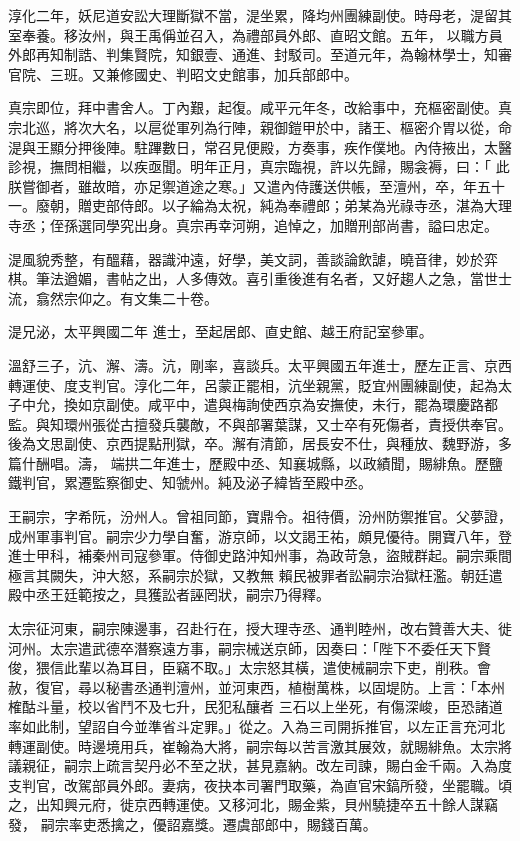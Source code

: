 \begin{pinyinscope}
 淳化二年，妖尼道安訟大理斷獄不當，湜坐累，降均州團練副使。時母老，湜留其室奉養。移汝州，與王禹偁並召入，為禮部員外郎、直昭文館。五年，
 以職方員外郎再知制誥、判集賢院，知銀壹、通進、封駁司。至道元年，為翰林學士，知審官院、三班。又兼修國史、判昭文史館事，加兵部郎中。



 真宗即位，拜中書舍人。丁內艱，起復。咸平元年冬，改給事中，充樞密副使。真宗北巡，將次大名，以扈從軍列為行陣，親御鎧甲於中，諸王、樞密介胃以從，命湜與王顯分押後陣。駐蹕數日，常召見便殿，方奏事，疾作僕地。內侍掖出，太醫診視，撫問相繼，以疾亟聞。明年正月，真宗臨視，許以先歸，賜衾褥，曰：「
 此朕嘗御者，雖故暗，亦足禦道途之寒。」又遣內侍護送供帳，至澶州，卒，年五十一。廢朝，贈吏部侍郎。以子綸為太祝，純為奉禮郎；弟某為光祿寺丞，湛為大理寺丞；侄孫選同學究出身。真宗再幸河朔，追悼之，加贈刑部尚書，謚曰忠定。



 湜風貌秀整，有醞藉，器識沖遠，好學，美文詞，善談論飲謔，曉音律，妙於弈棋。筆法遒媚，書帖之出，人多傳效。喜引重後進有名者，又好趨人之急，當世士流，翕然宗仰之。有文集二十卷。



 湜兄泌，太平興國二年
 進士，至起居郎、直史館、越王府記室參軍。



 溫舒三子，沆、澥、濤。沆，剛率，喜談兵。太平興國五年進士，歷左正言、京西轉運使、度支判官。淳化二年，呂蒙正罷相，沆坐親黨，貶宜州團練副使，起為太子中允，換如京副使。咸平中，遣與梅詢使西京為安撫使，未行，罷為環慶路都監。與知環州張從古擅發兵襲敵，不與部署葉謀，又士卒有死傷者，責授供奉官。後為文思副使、京西提點刑獄，卒。澥有清節，居長安不仕，與種放、魏野游，多篇什酬唱。濤，
 端拱二年進士，歷殿中丞、知襄城縣，以政績聞，賜緋魚。歷鹽鐵判官，累遷監察御史、知虢州。純及泌子緯皆至殿中丞。



 王嗣宗，字希阮，汾州人。曾祖同節，寶鼎令。祖待價，汾州防禦推官。父夢證，成州軍事判官。嗣宗少力學自奮，游京師，以文謁王祐，頗見優待。開寶八年，登進士甲科，補秦州司寇參軍。侍御史路沖知州事，為政苛急，盜賊群起。嗣宗乘間極言其闕失，沖大怒，系嗣宗於獄，又教無
 賴民被罪者訟嗣宗治獄枉濫。朝廷遣殿中丞王廷範按之，具獲訟者誣罔狀，嗣宗乃得釋。



 太宗征河東，嗣宗陳邊事，召赴行在，授大理寺丞、通判睦州，改右贊善大夫、徙河州。太宗遣武德卒潛察遠方事，嗣宗械送京師，因奏曰：「陛下不委任天下賢俊，猥信此輩以為耳目，臣竊不取。」太宗怒其橫，遣使械嗣宗下吏，削秩。會赦，復官，尋以秘書丞通判澶州，並河東西，植樹萬株，以固堤防。上言：「本州榷酤斗量，校以省鬥不及七升，民犯私釀者
 三石以上坐死，有傷深峻，臣恐諸道率如此制，望詔自今並準省斗定罪。」從之。入為三司開拆推官，以左正言充河北轉運副使。時邊境用兵，崔翰為大將，嗣宗每以苦言激其展效，就賜緋魚。太宗將議親征，嗣宗上疏言契丹必不至之狀，甚見嘉納。改左司諫，賜白金千兩。入為度支判官，改駕部員外郎。妻病，夜抉本司署門取藥，為直官宋鎬所發，坐罷職。頃之，出知興元府，徙京西轉運使。又移河北，賜金紫，貝州驍捷卒五十餘人謀竊發，
 嗣宗率吏悉擒之，優詔嘉獎。遷虞部郎中，賜錢百萬。




\end{pinyinscope}

